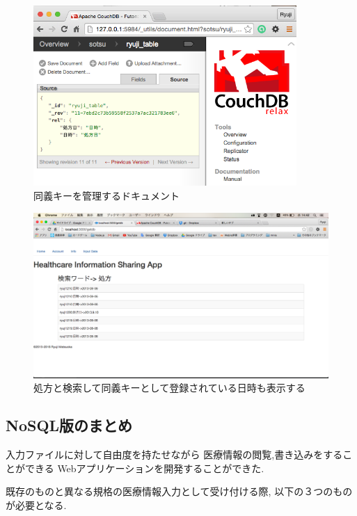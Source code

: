 	\begin{figure}[htbp]
		\begin{center}
			\includegraphics[width=10cm, bb=0 0 609 478, clip]{./gazou/relation2.png}
		\end{center}
		\caption{同義キーを管理するドキュメント}
		\label{relation}
	\end{figure}

	\begin{figure}[htbp]
		\begin{center}
			\includegraphics[width=15cm, bb=0 0 1366 768, clip]{./gazou/relationApp2.png}
		\end{center}
		\caption{処方と検索して同義キーとして登録されている日時も表示する}
		\label{relationApp}
	\end{figure}


\subsection{NoSQL版のまとめ}
	入力ファイルに対して自由度を持たせながら
	医療情報の閲覧,書き込みをすることができる
	Webアプリケーションを開発することができた.

	既存のものと異なる規格の医療情報入力として受け付ける際,
	以下の３つのものが必要となる.

